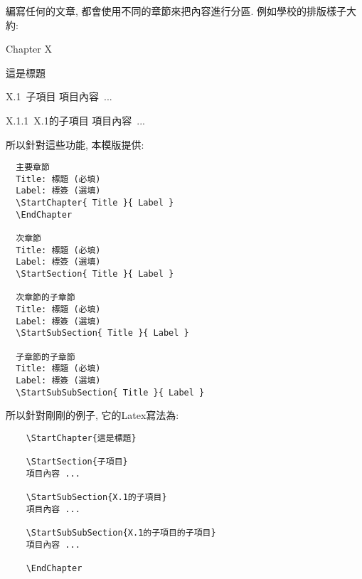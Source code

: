 

編寫任何的文章, 都會使用不同的章節來把內容進行分區. 例如學校的排版樣子大約:

\begin{minipage}{\textwidth}
  \begin{framed}
    \centerline{\LARGE Chapter X}
    \vspace{0.2cm}
    \centerline{\LARGE 這是標題}

    \vspace{0.5cm}
    \mbox{\Large X.1 子項目}
    \hspace{0.2cm}\mbox{項目內容 ...}

    \vspace{0.3cm}
    \hspace{0.2cm}\mbox{\large X.1.1 X.1的子項目}
    \hspace{0.4cm}\mbox{項目內容 ...}
  \end{framed}
\end{minipage}

所以針對這些功能, 本模版提供:
\begin{framed}
  \begin{verbatim}
  主要章節
  Title: 標題 (必填)
  Label: 標簽 (選填)
  \StartChapter{ Title }{ Label }
  \EndChapter

  次章節
  Title: 標題 (必填)
  Label: 標簽 (選填)
  \StartSection{ Title }{ Label }

  次章節的子章節
  Title: 標題 (必填)
  Label: 標簽 (選填)
  \StartSubSection{ Title }{ Label }

  子章節的子章節
  Title: 標題 (必填)
  Label: 標簽 (選填)
  \StartSubSubSection{ Title }{ Label }

  \end{verbatim}
\end{framed}

所以針對剛剛的例子, 它的Latex寫法為:

\begin{minipage}{\textwidth}
  \begin{framed}
  \begin{verbatim}
    \StartChapter{這是標題}

    \StartSection{子項目}
    項目內容 ...

    \StartSubSection{X.1的子項目}
    項目內容 ...

    \StartSubSubSection{X.1的子項目的子項目}
    項目內容 ...

    \EndChapter
  \end{verbatim}
  \end{framed}
\end{minipage}

